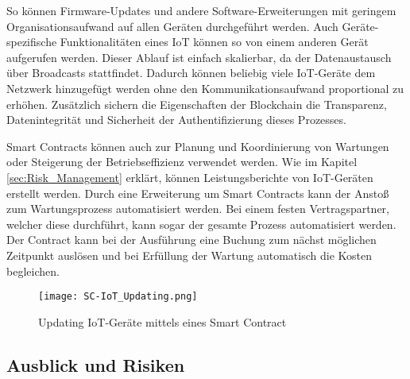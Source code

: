 So können Firmware-Updates und andere Software-Erweiterungen mit geringem Organisationsaufwand auf allen 
Geräten durchgeführt werden. 
Auch Geräte-spezifische Funktionalitäten eines IoT können so von einem anderen Gerät aufgerufen werden.
Dieser Ablauf ist einfach skalierbar, da der Datenaustausch über Broadcasts stattfindet.  
Dadurch können beliebig viele IoT-Geräte dem Netzwerk hinzugefügt werden ohne den Kommunikationsaufwand 
proportional zu erhöhen. 
Zusätzlich sichern die Eigenschaften der Blockchain die Transparenz, Datenintegrität und Sicherheit der
Authentifizierung dieses Prozesses.
\cite[p.~74f]{Choi2018DeviceControl}


Smart Contracts können auch zur Planung und Koordinierung von Wartungen oder Steigerung der Betriebseffizienz 
verwendet werden.
Wie im Kapitel \ref{sec:Risk_Management} erklärt, können Leistungsberichte von IoT-Geräten erstellt werden.
Durch eine Erweiterung um Smart Contracts kann der Anstoß zum Wartungsprozess automatisiert werden. Bei einem
festen Vertragspartner, welcher diese durchführt, kann sogar der gesamte Prozess automatisiert werden. 
Der Contract kann bei der Ausführung eine Buchung zum nächst möglichen Zeitpunkt auslösen und bei Erfüllung 
der Wartung automatisch die Kosten begleichen.
\cite[p.~169ff]{chowdhary2025smart}

\begin{figure}[!h]
    \begin{center}
        \texttt{[image: SC-IoT\_Updating.png]}
    \end{center}
    \caption{Updating IoT-Geräte mittels eines Smart Contract}
    \label{fig:SC-IoT_Update}
\end{figure}






\subsection{Ausblick und Risiken}

